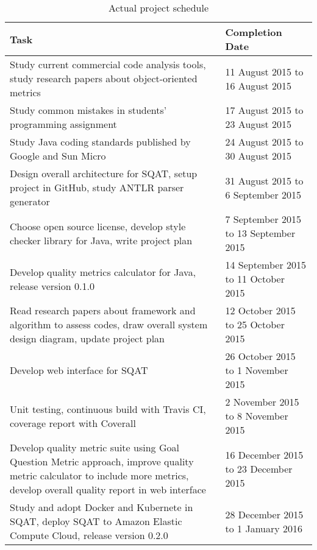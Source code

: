 \begin{table}
\centering
\begin{tabular}{| p{7.7cm} | p{5.8cm} |}
    \hline
    \textbf{Task} & \textbf{Completion Date} \\ 
    \hline
    Study current commercial code analysis tools, study research papers about object-oriented metrics & 11 August 2015 to 16 August 2015 \\
    \hline
    Study common mistakes in students' programming assignment & 17 August 2015 to 23 August 2015 \\
    \hline
    Study Java coding standards published by Google and Sun Micro & 24 August 2015 to 30 August 2015 \\
    \hline
    Design overall architecture for SQAT, setup project in GitHub, study ANTLR parser generator & 31 August 2015 to 6 September 2015 \\
    \hline
    Choose open source license, develop style checker library for Java, write project plan & 7 September 2015 to 13 September 2015 \\
    \hline
    Develop quality metrics calculator for Java, release version 0.1.0 & 14 September 2015 to 11 October 2015 \\
    \hline
    Read research papers about framework and algorithm to assess codes, draw overall system design diagram, update project plan & 12 October 2015 to 25 October 2015 \\
    \hline
    Develop web interface for SQAT & 26 October 2015 to 1 November 2015 \\
    \hline
    Unit testing, continuous build with Travis CI, coverage report with Coverall & 2 November 2015 to 8 November 2015 \\
    \hline
    Develop quality metric suite using Goal Question Metric approach, improve quality metric calculator to include more metrics, develop overall quality report in web interface & 16 December 2015 to 23 December 2015 \\
    \hline
    Study and adopt Docker and Kubernete in SQAT, deploy SQAT to Amazon Elastic Compute Cloud, release version 0.2.0 & 28 December 2015 to 1 January 2016 \\
    \hline
\end{tabular}
\caption{Actual project schedule}
\label{table:project_schedule_actual}
\end{table}